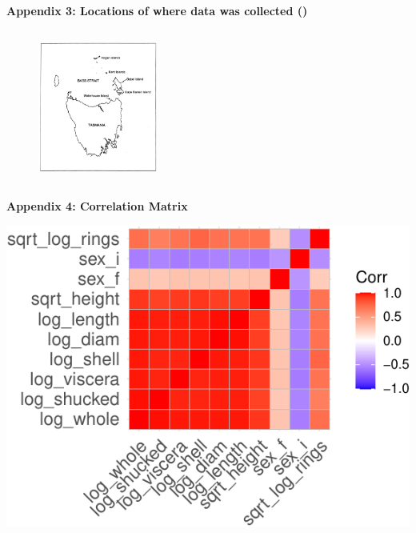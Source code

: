 \documentclass[letterpaper,9pt,twocolumn,twoside,]{pinp}
\begin{document}
\textbf{Appendix 3: Locations of where data was collected (\cite{article})}

\begin{figure}[H]
    \begin{center}
    \includegraphics[width=0.35\textwidth, height=2in]{Independence} 
    \end{center}
\end{figure}

\newpage

\textbf{Appendix 4: Correlation Matrix}

\begin{center}\includegraphics{ExecSum_files/figure-latex/unnamed-chunk-12-1} \end{center}


\pnasbreak 
\end{document}
